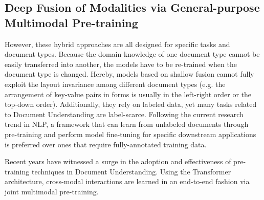 


\subsection{Deep Fusion of Modalities via General-purpose Multimodal Pre-training}
\label{subsection:chapter2-deep-fusion}

However, these hybrid approaches are all designed for specific tasks and document types. Because the domain knowledge of one document type cannot be easily transferred into another, the models have to be re-trained when the document type is changed. Hereby, models based on shallow fusion cannot fully exploit the layout invariance among different document types (e.g. the arrangement of key-value pairs in forms is usually in the left-right order or the top-down order). Additionally, they rely on labeled data, yet many tasks related to Document Understanding are label-scarce. Following the current research trend in \ac{NLP}, a framework that can learn from unlabeled documents through pre-training and perform model fine-tuning for specific downstream applications is preferred over ones that require fully-annotated training data.

Recent years have witnessed a surge in the adoption and effectiveness of pre-training techniques in Document Understanding. Using the Transformer architecture, cross-modal interactions are learned in an end-to-end fashion via joint multimodal pre-training.


